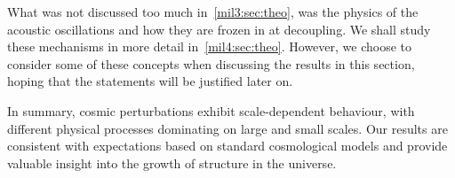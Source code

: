 













What was not discussed too much in~\cref{mil3:sec:theo}, was the physics of the acoustic oscillations and how they are frozen in at decoupling. We shall study these mechanisms in more detail in~\cref{mil4:sec:theo}. However, we choose to consider some of these concepts when discussing the results in this section, hoping that the statements will be justified later on.


In summary, cosmic perturbations exhibit scale-dependent behaviour, with different physical processes dominating on large and small scales. Our results are consistent with expectations based on standard cosmological models and provide valuable insight into the growth of structure in the universe.



